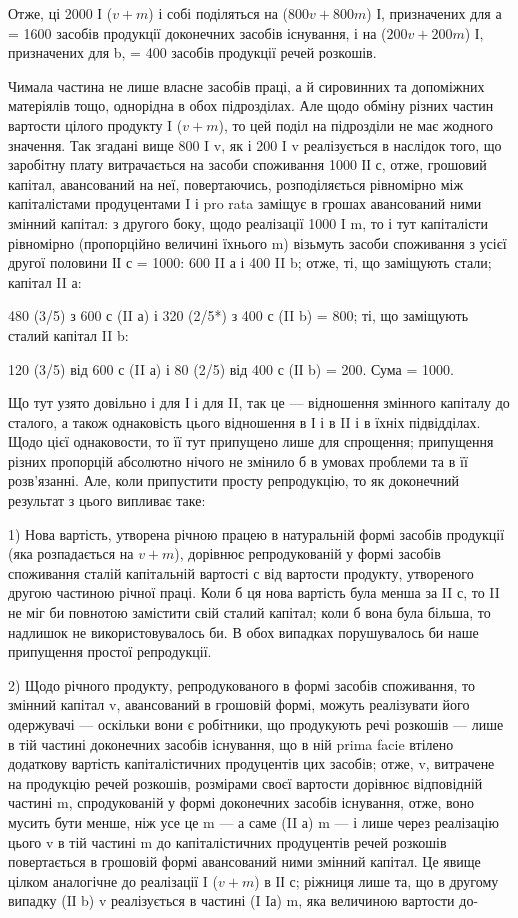 Отже, ці 2000 І ($v + m$) і собі поділяться на ($800 v + 800 m$) І,
призначених для а = 1600 засобів продукції доконечних засобів існування,
і на ($200 v + 200 m$) І, призначених для b, = 400 засобів продукції
речей розкошів.

Чимала частина не лише власне засобів праці, а й сировинних та
допоміжних матеріялів тощо, однорідна в обох підрозділах. Але щодо
обміну різних частин вартости цілого продукту I ($v + m$), то цей поділ
на підрозділи не має жодного значення. Так згадані вище 800 I v, як і
200 I v реалізується в наслідок того, що заробітну плату витрачається
на засоби споживання 1000 ІІ с, отже, грошовий капітал, авансований на
неї, повертаючись, розподіляється рівномірно між капіталістами продуцентами
I і pro rata заміщує в грошах авансований ними змінний капітал:
з другого боку, щодо реалізації 1000 I m, то і тут капіталісти рівномірно
(пропорційно величині їхнього m) візьмуть засоби споживання з
усієї другої половини ІІ с = 1000: 600 II а і 400 II b; отже, ті, що заміщують
стали; капітал II а:

480 (3/5) з 600 с (II а) і 320 (2/5*) з 400 с (II b) = 800; ті, що заміщують
сталий капітал II b:

120 (3/5) від 600 с (II а) і 80 (2/5) від 400 с (ІІ b) = 200. Сума = 1000.

Що тут узято довільно і для І і для II, так це — відношення змінного
капіталу до сталого, а також однаковість цього відношення в
І і в II і в їхніх підвідділах. Щодо цієї однаковости, то її тут припущено
лише для спрощення; припущення різних пропорцій абсолютно нічого
не змінило б в умовах проблеми та в її розв’язанні. Але, коли припустити
просту репродукцію, то як доконечний результат з цього випливає таке:

1) Нова вартість, утворена річною працею в натуральній формі засобів
продукції (яка розпадається на $v + m$), дорівнює репродукованій
у формі засобів споживання сталій капітальній вартості с від вартости
продукту, утвореного другою частиною річної праці. Коли б ця нова вартість
була менша за II с, то II не міг би повнотою замістити свій сталий капітал;
коли б вона була більша, то надлишок не використовувалось би. В
обох випадках порушувалось би наше припущення простої репродукції.

2) Щодо річного продукту, репродукованого в формі засобів споживання,
то змінний капітал v, авансований в грошовій формі, можуть реалізувати
його одержувачі — оскільки вони є робітники, що продукують
речі розкошів — лише в тій частині доконечних засобів існування, що в
ній prima facie втілено додаткову вартість капіталістичних продуцентів
цих засобів; отже, v, витрачене на продукцію речей розкошів, розмірами
своєї вартости дорівнює відповідній частині m, спродукованій у
формі доконечних засобів існування, отже, воно мусить бути менше, ніж
усе це m — а саме (II а) m — і лише через реалізацію цього v в тій частині
m до капіталістичних продуцентів речей розкошів повертається в грошовій
формі авансований ними змінний капітал. Це явище цілком аналогічне
до реалізації I ($v + m$) в ІІ с; ріжниця лише та, що в другому випадку
(IІ b) v реалізується в частині (I Iа) m, яка величиною вартости до-

